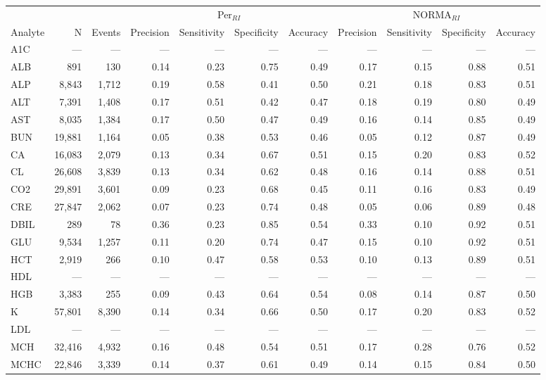 \begin{table}[ht]
\centering
\footnotesize
\begin{tabular}{lrrrrrrrrrr}
\toprule
 & &  & \multicolumn{4}{c}{Per$_{RI}$} & \multicolumn{4}{c}{NORMA$_{RI}$} \\
\cmidrule(lr){4-7} \cmidrule(lr){8-11}
Analyte & N & Events & Precision & Sensitivity & Specificity & Accuracy & Precision & Sensitivity & Specificity & Accuracy \\
\midrule
A1C & --- & --- & --- & --- & --- & --- & --- & --- & --- & --- \\
ALB & 891 & 130 & 0.14 & 0.23 & 0.75 & 0.49 & 0.17 & 0.15 & 0.88 & 0.51 \\
ALP & 8,843 & 1,712 & 0.19 & 0.58 & 0.41 & 0.50 & 0.21 & 0.18 & 0.83 & 0.51 \\
ALT & 7,391 & 1,408 & 0.17 & 0.51 & 0.42 & 0.47 & 0.18 & 0.19 & 0.80 & 0.49 \\
AST & 8,035 & 1,384 & 0.17 & 0.50 & 0.47 & 0.49 & 0.16 & 0.14 & 0.85 & 0.49 \\
BUN & 19,881 & 1,164 & 0.05 & 0.38 & 0.53 & 0.46 & 0.05 & 0.12 & 0.87 & 0.49 \\
CA & 16,083 & 2,079 & 0.13 & 0.34 & 0.67 & 0.51 & 0.15 & 0.20 & 0.83 & 0.52 \\
CL & 26,608 & 3,839 & 0.13 & 0.34 & 0.62 & 0.48 & 0.16 & 0.14 & 0.88 & 0.51 \\
CO2 & 29,891 & 3,601 & 0.09 & 0.23 & 0.68 & 0.45 & 0.11 & 0.16 & 0.83 & 0.49 \\
CRE & 27,847 & 2,062 & 0.07 & 0.23 & 0.74 & 0.48 & 0.05 & 0.06 & 0.89 & 0.48 \\
DBIL & 289 & 78 & 0.36 & 0.23 & 0.85 & 0.54 & 0.33 & 0.10 & 0.92 & 0.51 \\
GLU & 9,534 & 1,257 & 0.11 & 0.20 & 0.74 & 0.47 & 0.15 & 0.10 & 0.92 & 0.51 \\
HCT & 2,919 & 266 & 0.10 & 0.47 & 0.58 & 0.53 & 0.10 & 0.13 & 0.89 & 0.51 \\
HDL & --- & --- & --- & --- & --- & --- & --- & --- & --- & --- \\
HGB & 3,383 & 255 & 0.09 & 0.43 & 0.64 & 0.54 & 0.08 & 0.14 & 0.87 & 0.50 \\
K & 57,801 & 8,390 & 0.14 & 0.34 & 0.66 & 0.50 & 0.17 & 0.20 & 0.83 & 0.52 \\
LDL & --- & --- & --- & --- & --- & --- & --- & --- & --- & --- \\
MCH & 32,416 & 4,932 & 0.16 & 0.48 & 0.54 & 0.51 & 0.17 & 0.28 & 0.76 & 0.52 \\
MCHC & 22,846 & 3,339 & 0.14 & 0.37 & 0.61 & 0.49 & 0.14 & 0.15 & 0.84 & 0.50 \\

\end{tabular}
\end{table}
